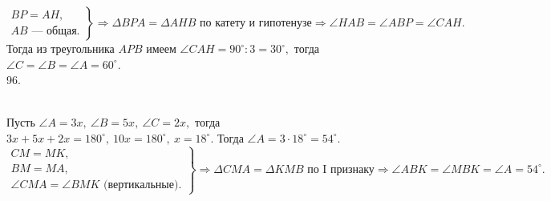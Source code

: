 \documentclass[12pt]{article}
\begin{document}
$\left.\begin{array}{l}BP=AH,\\
AB\text{ --- общая.} \end{array}\right\}\Rightarrow \Delta BPA=\Delta AHB\text{ по катету и гипотенузе}\Rightarrow \angle HAB=\angle ABP=\angle CAH.$ Тогда из треугольника $APB$ имеем $\angle CAH=90^\circ:3=30^\circ,$ тогда $\angle C=\angle B=\angle A=60^\circ.$\\
96. \begin{figure}[ht!]
\end{figure}\\
Пусть $\angle A=3x,\ \angle B=5x,\ \angle C=2x,$ тогда $3x+5x+2x=180^\circ,\ 10x=180^\circ,\ x=18^\circ.$ Тогда $\angle A=3\cdot18^\circ=54^\circ.$
$\left.\begin{array}{l}CM=MK,\\
BM=MA,\\
\angle CMA=\angle BMK\text{ (вертикальные).}\end{array}\right\}\Rightarrow \Delta CMA=\Delta KMB\text{ по I признаку}\Rightarrow \angle ABK=\angle MBK=\angle A=54^\circ.$\newpage
\end{document}
